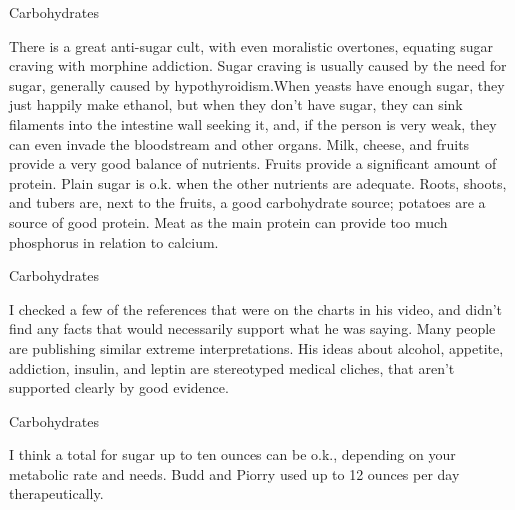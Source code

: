 \documentclass[11pt,oneside,openany,extrafontsizes]{memoir}
\begin{document}
\begin{standalonequote}{Carbohydrates}

    \begin{answer}
        There is a great anti-sugar cult, with even moralistic overtones, equating sugar craving with morphine addiction. Sugar craving is usually caused by the need for sugar, generally caused by hypothyroidism.When yeasts have enough sugar, they just happily make ethanol, but when they don't have sugar, they can sink filaments into the intestine wall seeking it, and, if the person is very weak, they can even invade the bloodstream and other organs. Milk, cheese, and fruits provide a very good balance of nutrients. Fruits provide a significant amount of protein. Plain sugar is o.k. when the other nutrients are adequate. Roots, shoots, and tubers are, next to the fruits, a good carbohydrate source; potatoes are a source of good protein. Meat as the main protein can provide too much phosphorus in relation to calcium.
    \end{answer}
\end{standalonequote}

\begin{standalonequote}{Carbohydrates}

    \begin{answer}
        I checked a few of the references that were on the charts in his video, and didn't find any facts that would necessarily support what he was saying. Many people are publishing similar extreme interpretations. His ideas about alcohol, appetite, addiction, insulin, and leptin are stereotyped medical cliches, that aren't supported clearly by good evidence.
    \end{answer}
\end{standalonequote}

\begin{standalonequote}{Carbohydrates}

    \begin{answer}
        I think a total for sugar up to ten ounces can be o.k., depending on your metabolic rate and needs. Budd and Piorry used up to 12 ounces per day therapeutically.
    \end{answer}
\end{standalonequote}
\end{document}
